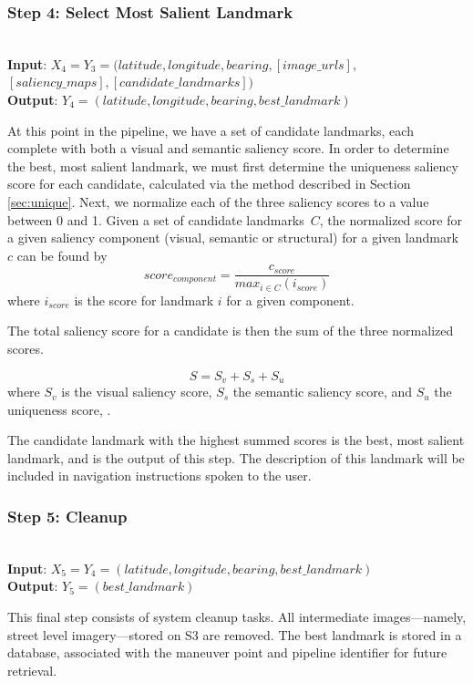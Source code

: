 \subsubsection*{Step 4: Select Most Salient Landmark}~\\
\noindent\textbf{Input}: $X_4 = Y_3 = (latitude, longitude, bearing,  [image\_urls],$\\ $[saliency\_maps], [candidate\_landmarks] )$\\
\textbf{Output}: $Y_4 = (latitude, longitude, bearing, best\_landmark)$ 

At this point in the pipeline, we have a set of candidate landmarks, each complete with both a visual and semantic saliency score. In order to determine the best, most salient landmark, we must first determine the uniqueness saliency score for each candidate, calculated via the method described in Section \ref{sec:unique}. Next, we normalize each of the three saliency scores to a value between 0 and 1. Given a set of candidate landmarks~$C$, the normalized score for a given saliency component (visual, semantic or structural) for a given landmark $c$ can be found by
\begin{equation}
    score_{component} = \frac{c_{score}}{max_{i \in C}(i_{score})}
\end{equation}
where $i_{score}$ is the score for landmark $i$ for a given component.

The total saliency score for a candidate is then the sum of the three normalized scores. 

\begin{equation}\label{eq:saliency}
    S = S_v + S_s + S_u
\end{equation}
where $S_v$ is the visual saliency score, $S_s$ the semantic saliency score, and $S_u$ the uniqueness score, .

The candidate landmark with the highest summed scores is the best, most salient landmark, and is the output of this step. The description of this landmark will be included in navigation instructions spoken to the user.

\subsubsection*{Step 5: Cleanup}~\\
\noindent\textbf{Input}: $X_5 = Y_4 = (latitude, longitude, bearing, best\_landmark)$\\
\textbf{Output}: $Y_5 = (best\_landmark)$

This final step consists of system cleanup tasks. All intermediate images---namely, street level imagery---stored on S3 are removed. The best landmark is stored in a database, associated with the maneuver point and pipeline identifier for future retrieval.

